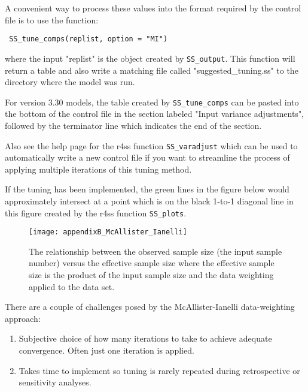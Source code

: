 A convenient way to process these values into the format required by the control file is to use the function:

\texttt{ SS\_tune\_comps(replist, option = "MI") }

where the input "replist" is the object created by \texttt{SS\_output}. This function will return a table and also write a matching file called "suggested\_tuning.ss" to the directory where the model was run.

For version 3.30 models, the table created by \texttt{SS\_tune\_comps} can be pasted into the bottom of the control file in the section labeled "Input variance adjustments", followed by the terminator line which indicates the end of the section. 


Also see the help page for the r4ss function \texttt{SS\_varadjust} which can be used to automatically write a new control file if you want to streamline the process of applying multiple iterations of this tuning method.

If the tuning has been implemented, the green lines in the figure below would approximately intersect at a point which is on the black 1-to-1 diagonal line in this figure created by the r4ss function \texttt{SS\_plots}.

\begin{figure}[h]
	\begin{center}
		\texttt{[image: appendixB\_McAllister\_Ianelli]}\\
	\end{center}

	\caption{ The relationship between the observed sample size (the input sample number) versus the effective sample size where the effective sample size is the product of the input sample size and the data weighting applied to the data set. }
	\label{(fig:mcallister)}
\end{figure}

There are a couple of challenges posed by the McAllister-Ianelli data-weighting approach:
\begin{enumerate}
	\item Subjective choice of how many iterations to take to achieve adequate convergence. Often just one iteration is applied.
	
	\item Takes time to implement so tuning is rarely repeated during retrospective or sensitivity analyses.
\end{enumerate}

\hypertarget{Francis}{}

